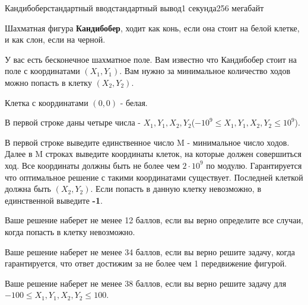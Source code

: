 \begin{problem}{Кандибобер}{стандартный ввод}{стандартный вывод}{1 секунда}{256 мегабайт}

Шахматная фигура \textbf{Кандибобер}, ходит как конь, если она стоит на белой клетке, и как слон, если на черной.

У вас есть бесконечное шахматное поле. Вам известно что Кандибобер стоит на поле с координатами $(X_1, Y_1)$. Вам нужно за минимальное количество ходов можно попасть в клетку $(X_2, Y_2)$.

Клетка с координатами $(0, 0)$ - белая.


\InputFile
В первой строке даны четыре числа - $X_1, Y_1, X_2, Y_2$($-10^9 \leq X_1, Y_1, X_2, Y_2 \leq 10^9$).

\OutputFile
В первой строке выведите единственное число M - минимальное число ходов.
Далее в M строках выведите координаты клеток, на которые должен совершиться ход. Все координаты должны быть не более чем $2 \cdot 10^9$ по модулю. Гарантируется что оптимальное решение с такими координатами существует. Последней клеткой должна быть $(X_2, Y_2)$.
Если попасть в данную клетку невозможно, в единственной выведите \textbf{-1}.

\Examples

\begin{example}
%
%
%
\end{example}

\Note
Ваше решение наберет не менее 12 баллов, если вы верно определите все случаи, когда попасть в клетку невозможно.

Ваше решение наберет не менее 34 баллов, если вы верно решите задачу, когда гарантируется, что ответ достижим за не более чем 1 передвижение фигурой.

Ваше решение наберет не менее 38 баллов, если вы верно решите задачу для $-100 \leq X_1, Y_1, X_2, Y_2 \leq 100$.

\end{problem}

